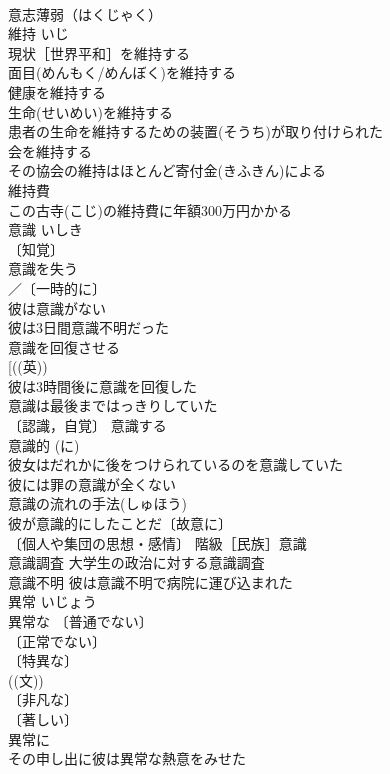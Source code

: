 \documentclass[8pt]{extreport}
\begin{document}
\begin{CJK}{UTF8}{min}
\\	意志薄弱（はくじゃく） 
\\	維持	いじ	
\\	現状［世界平和］を維持する 
\\	面目(めんもく/めんぼく)を維持する 
\\	健康を維持する 
\\	生命(せいめい)を維持する 
\\	患者の生命を維持するための装置(そうち)が取り付けられた 
\\	会を維持する 
\\	その協会の維持はほとんど寄付金(きふきん)による 
\\	維持費 
\\	この古寺(こじ)の維持費に年額300万円かかる 
\\	意識	いしき	
\\	〔知覚〕
\\	意識を失う 
\\	／〔一時的に〕
\\	彼は意識がない 
\\	彼は3日間意識不明だった 
\\	意識を回復させる 
\\	[((英)) 
\\	彼は3時間後に意識を回復した 
\\	意識は最後まではっきりしていた 
\\	〔認識，自覚〕 意識する 
\\	意識的 (に) 
\\	彼女はだれかに後をつけられているのを意識していた 
\\	彼には罪の意識が全くない 
\\	意識の流れの手法(しゅほう) 
\\	彼が意識的にしたことだ〔故意に〕 
\\	〔個人や集団の思想・感情〕 階級［民族］意識 
\\	意識調査 大学生の政治に対する意識調査 
\\	意識不明 彼は意識不明で病院に運び込まれた 
\\	異常	いじょう	
\\	異常な 〔普通でない〕
\\	〔正常でない〕
\\	〔特異な〕
\\	((文)) 
\\	〔非凡な〕
\\	〔著しい〕
\\	異常に 
\\	その申し出に彼は異常な熱意をみせた 

\end{CJK}
\end{document}
